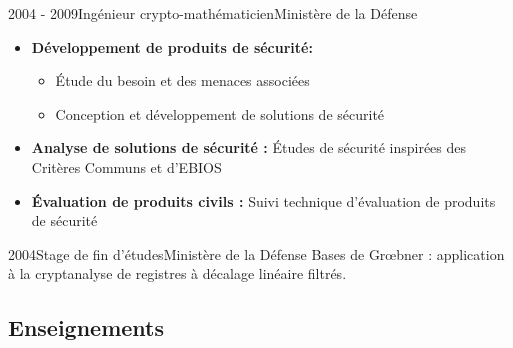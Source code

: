 \documentclass[french, a4paper]{customcv}
\begin{document}
\begin{cventry}{2004 - 2009}{Ingénieur crypto-mathématicien}{Ministère de la Défense}
  \begin{itemize}
    \item \textbf{Développement de produits de sécurité:}
          \begin{itemize}
            \item \'Etude du besoin et des menaces associées
            \item Conception et développement de solutions de sécurité
          \end{itemize}
    \item \textbf{Analyse de solutions de sécurité : }
          \'Etudes de sécurité inspirées des Critères Communs et d'EBIOS
    \item \textbf{\'Evaluation de produits civils :} Suivi technique d'évaluation de produits de sécurité
  \end{itemize}
\end{cventry}

\begin{cventry}{2004}{Stage de fin d'études}{Ministère de la Défense}
  Bases de Gr\oe bner : application  à la cryptanalyse de registres à décalage linéaire filtrés.
\end{cventry}

\subsection{Enseignements}
\end{document}
